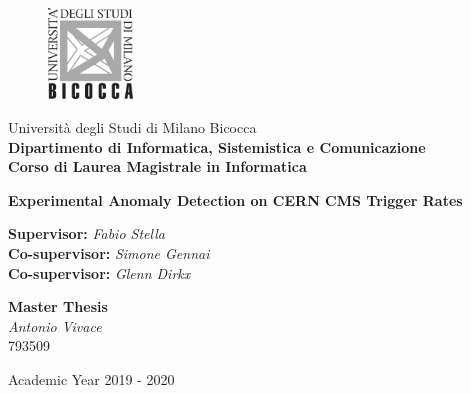 
\thispagestyle{empty}
\addtocounter{page}{-1}

	\begin{figure}
		\vspace*{-8mm}
		\centering
		\includegraphics[width=0.20\textwidth]{logo-milano-bicocca.jpg}
	\end{figure}
	\large \noindent Università degli Studi di Milano Bicocca \\
	\textbf{Dipartimento di Informatica, Sistemistica e Comunicazione \\
			Corso di Laurea Magistrale in Informatica}

\vfill


\begin{center}
	{\Huge \textbf{Experimental Anomaly Detection on CERN CMS Trigger Rates}}
\end{center}

\vfill

\begin{flushleft}
	{\Large \textbf{Supervisor:} \textit{Fabio Stella} \\
	 \textbf{Co-supervisor:} \textit{Simone Gennai} \\
	 \textbf{Co-supervisor:} \textit{Glenn Dirkx}}
\end{flushleft}

\vspace{8mm}
\par

\begin{flushright}
	{\Large \textbf{Master Thesis} \\
			\textit{Antonio Vivace} \\ 793509}
\end{flushright}

\vfill
\par

\begin{center}
	{\large Academic Year 2019 - 2020}
\end{center}

\clearpage